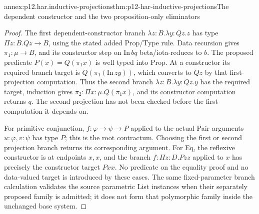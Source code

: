 \begin{annexitem}{annex:p12.har.inductive-projections}{thm:p12-har-inductive-projections}{The dependent constructor and the two proposition-only eliminators}
\begin{proof}
The first dependent-constructor branch
\(\lambda z:B.\lambda y:Qz.z\) has type
\(\Pi z:B.Qz\to B\), using the stated added Prop/Type rule.
Data recursion gives \(\pi_1:\mu\to B\), and its constructor
step on \(\mathrm{In}\,bq\) beta/iota-reduces to \(b\).
The proposed predicate \(P(x)=Q(\pi_1x)\) is well typed into
Prop. At a constructor its required branch target is
\(Q(\pi_1(\mathrm{In}\,zy))\), which converts to \(Qz\)
by that first-projection computation. Thus the second branch
\(\lambda z:B.\lambda y:Qz.y\) has the required target,
induction gives \(\pi_2:\Pi x:\mu.Q(\pi_1x)\), and its
constructor computation returns \(q\). The second projection
has not been checked before the first computation it depends on.

For primitive conjunction, \(f:\varphi\to\psi\to P\)
applied to the actual Pair arguments \(u:\varphi,v:\psi\)
has type \(P\); this is the root contractum. Choosing the first
or second projection branch returns its corresponding argument. For
Eq, the reflexive constructor is at endpoints \(x,x\), and
the branch \(f:\Pi z:D.Pzz\) applied to \(x\) has precisely
the constructor target \(Pxx\). No predicate on the equality
proof and no data-valued target is introduced by these cases. The
same fixed-parameter branch calculation validates the source parametric
List instances when their separately proposed family is admitted; it
does not form that polymorphic family inside the unchanged base system.
\end{proof}
\end{annexitem}
